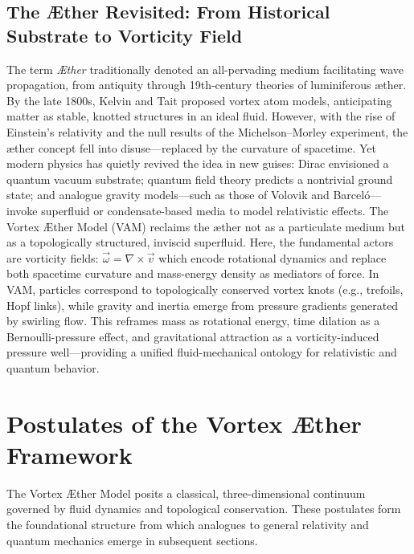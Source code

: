 \subsection*{The Æther Revisited: From Historical Substrate to Vorticity Field}
The term \textit{Æther} traditionally denoted an all-pervading medium facilitating wave propagation, from antiquity through 19th-century theories of luminiferous æther. By the late 1800s, Kelvin and Tait proposed vortex atom models, anticipating matter as stable, knotted structures in an ideal fluid. However, with the rise of Einstein’s relativity and the null results of the Michelson--Morley experiment, the æther concept fell into disuse---replaced by the curvature of spacetime.
Yet modern physics has quietly revived the idea in new guises: Dirac envisioned a quantum vacuum substrate; quantum field theory predicts a nontrivial ground state; and analogue gravity models---such as those of Volovik and Barceló---invoke superfluid or condensate-based media to model relativistic effects.
The Vortex Æther Model (VAM) reclaims the æther not as a particulate medium but as a topologically structured, inviscid superfluid. Here, the fundamental actors are vorticity fields: $\vec{\omega} = \nabla \times \vec{v}$ which encode rotational dynamics and replace both spacetime curvature and mass-energy density as mediators of force.
In VAM, particles correspond to topologically conserved vortex knots (e.g., trefoils, Hopf links), while gravity and inertia emerge from pressure gradients generated by swirling flow. This reframes mass as rotational energy, time dilation as a Bernoulli-pressure effect, and gravitational attraction as a vorticity-induced pressure well---providing a unified fluid-mechanical ontology for relativistic and quantum behavior.

\section*{Postulates of the Vortex \AE ther Framework}
The Vortex \AE ther Model posits a classical, three-dimensional continuum governed by fluid dynamics and topological conservation. These postulates form the foundational structure from which analogues to general relativity and quantum mechanics emerge in subsequent sections.

